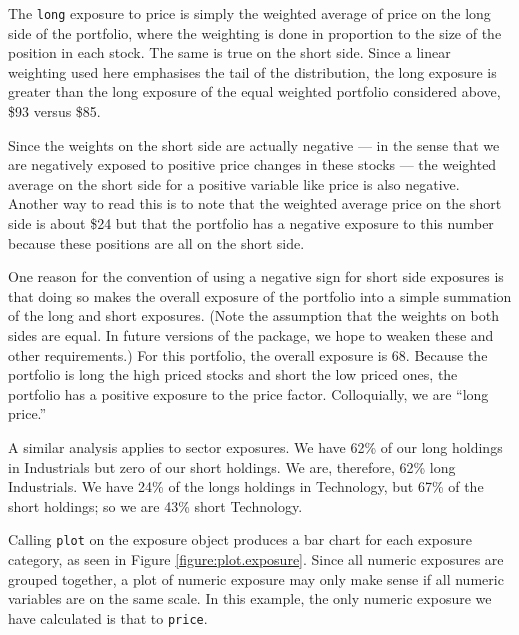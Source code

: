 \documentclass[a4paper]{report}
\begin{document}
\begin{article}
The \texttt{long} exposure to price is simply the weighted average of
price on the long side of the portfolio, where the weighting is done
in proportion to the size of the position in each stock. The same is
true on the short side.  Since a linear weighting used here emphasises
the tail of the distribution, the long exposure is greater than the
long exposure of the equal weighted portfolio considered above, \$93
versus \$85.

Since the weights on the short side are actually negative --- in the
sense that we are negatively exposed to positive price changes in
these stocks --- the weighted average on the short side for a positive
variable like price is also negative.  Another way to read this is to
note that the weighted average price on the short side is about \$24
but that the portfolio has a negative exposure to this number because
these positions are all on the short side.

One reason for the convention of using a negative sign for short side
exposures is that doing so makes the overall exposure of the portfolio
into a simple summation of the long and short exposures. (Note the
assumption that the weights on both sides are equal. In future
versions of the  package, we hope to weaken these and
other requirements.) For this portfolio, the overall exposure is 68.
Because the portfolio is long the high priced stocks and short the low
priced ones, the portfolio has a positive exposure to the price
factor. Colloquially, we are ``long price.''

A similar analysis applies to sector exposures. We have 62\% of our
long holdings in Industrials but zero of our short holdings. We are,
therefore, 62\% long Industrials. We have 24\% of the longs holdings
in Technology, but 67\% of the short holdings; so we are 43\% short
Technology.

Calling \texttt{plot} on the exposure object produces a bar chart for
each exposure category, as seen in Figure \ref{figure:plot.exposure}.  Since all
numeric exposures are grouped together, a plot of numeric exposure may
only make sense if all numeric variables are on the same scale.  In
this example, the only numeric exposure we have calculated is that to
\texttt{price}.


\end{article}
\end{document}
